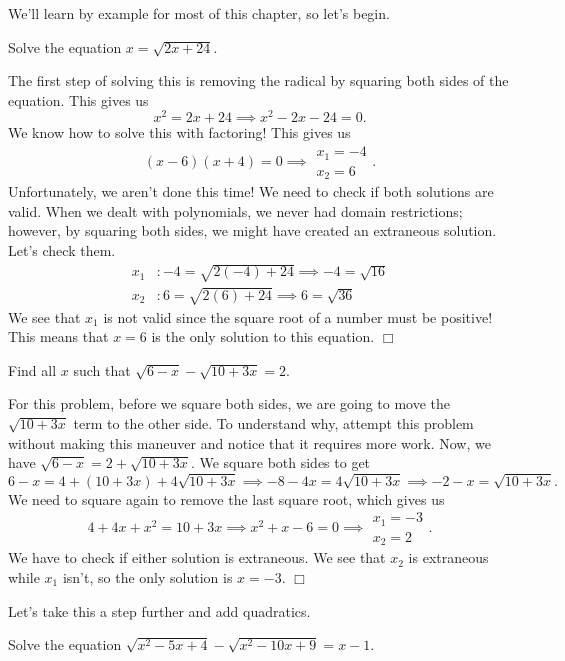 \documentclass[lang=en,11pt]{elegantbook}
\begin{document}
We'll learn by example for most of this chapter, so let's begin.
\begin{example}
Solve the equation $x=\sqrt{2x+24}$.
\end{example}
\begin{solution}
The first step of solving this is removing the radical by squaring both sides of the equation.  This gives us $$x^2=2x+24 \implies x^2-2x-24=0.$$ We know how to solve this with factoring! This gives us $$(x-6)(x+4)=0 \implies \begin{matrix} x_1=-4 \\ x_2=6\end{matrix}.$$ Unfortunately, we aren't done this time! We need to check if both solutions are valid.  When we dealt with polynomials, we never had domain restrictions; however, by squaring both sides, we might have created an extraneous solution.  Let's check them. 
\begin{align*}
    x_1&: -4=\sqrt{2(-4)+24} \implies -4=\sqrt{16} \\
    x_2&: 6=\sqrt{2(6)+24} \implies 6=\sqrt{36}
\end{align*}
We see that $x_1$ is not valid since the square root of a number must be positive!  This means that $x=6$ is the only solution to this equation. $\Box$
\end{solution}
\begin{example}
Find all $x$ such that $\sqrt{6-x}-\sqrt{10+3x}=2.$
\end{example}
\begin{solution}
For this problem, before we square both sides, we are going to move the $\sqrt{10+3x}$ term to the other side.  To understand why, attempt this problem without making this maneuver and notice that it requires more work.  Now, we have $\sqrt{6-x}=2+\sqrt{10+3x}.$ We square both sides to get $$6-x=4+(10+3x)+4\sqrt{10+3x} \implies -8-4x=4\sqrt{10+3x} \implies -2-x=\sqrt{10+3x}.$$ We need to square again to remove the last square root, which gives us $$4+4x+x^2=10+3x \implies x^2+x-6=0 \implies \begin{matrix} x_1=-3 \\ x_2=2 \end{matrix}.$$
We have to check if either solution is extraneous.  We see that $x_2$ is extraneous while $x_1$ isn't, so the only solution is $x=-3$. $\Box$
\end{solution}
Let's take this a step further and add quadratics.
\begin{example}
Solve the equation $\sqrt{x^2-5x+4}-\sqrt{x^2-10x+9}=x-1$.
\end{example}
\end{document}

